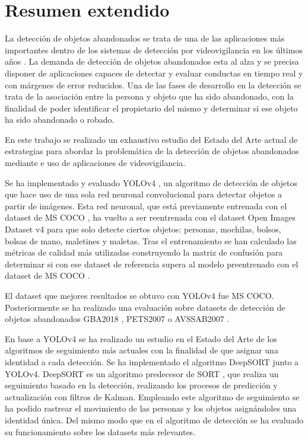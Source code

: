 
\chapter*{Resumen extendido}
\label{cha:resumen-extendido}


La detección de objetos abandonados se trata de una de las aplicaciones más importantes dentro de los sistemas de detección por videovigilancia en los últimos años \cite{DBLP:journals/spm/PlataniotisR05}. La demanda de detección de objetos abandonados esta al alza y se precisa disponer de aplicaciones capaces de detectar y evaluar conductas en tiempo real y con márgenes de error reducidos. Una de las fases de desarrollo en la detección se trata de la asociación entre la persona y objeto que ha sido abandonado, con la finalidad de poder identificar el propietario del mismo y determinar si ese objeto ha sido abandonado o robado.

En este trabajo se realizado un exhaustivo estudio del Estado del Arte actual de estrategias para abordar la problemática de la detección de objetos abandonados mediante e uso de aplicaciones de videovigilancia.

Se ha implementado y evaluado YOLOv4 \cite{bochkovskiy2020yolov4}, un algoritmo de detección de objetos que hace uso de una sola red neuronal convolucional para detectar objetos a partir de imágenes. Esta red neuronal, que está previamente entrenada con el dataset de MS COCO \cite{lin2015microsoft}, ha vuelto a ser reentrenada con el dataset Open Images Dataset v4 \cite{Kuznetsova_2020} para que solo detecte ciertos objetos: personas, mochilas, bolsos, bolsas de mano, maletines y maletas. Tras el entrenamiento se han calculado las métricas de calidad más utilizadas construyendo la matriz de confusión para determinar si con ese dataset de referencia supera al modelo preentrenado con el dataset de MS COCO \cite{lin2015microsoft}.

El dataset que mejores resultados se obtuvo con YOLOv4 \cite{bochkovskiy2020yolov4} fue MS COCO. Posteriormente se ha realizado una evaluación sobre datasets de detección de objetos abandonados GBA2018 \cite{gba-dataset}, PETS2007 \cite{pets2007-dataset} o AVSSAB2007 \cite{AVSSAB2007-dataset}. 

En base a YOLOv4 se ha realizado un estudio en el Estado del Arte de los algoritmos de seguimiento más actuales con la finalidad de que asignar una identidad a cada detección. Se ha implementado el algoritmo DeepSORT \cite{Wojke2017simple} junto a YOLOv4. DeepSORT  es un algoritmo predecesor de SORT \cite{Bewley_2016}, que realiza un seguimiento basado en la detección, realizando los procesos de predicción y actualización con filtros de Kalman. Empleando este algoritmo de seguimiento se ha podido rastrear el movimiento de las personas y los objetos asignándoles una identidad única. Del mismo modo que en el algoritmo de detección se ha evaluado su funcionamiento sobre los datasets más relevantes.

